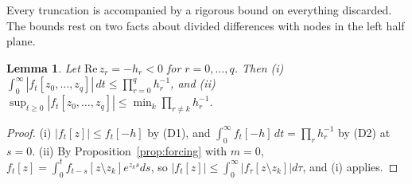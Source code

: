 \documentclass[aps,pra,superscriptaddress,floatfix,longbibliography,twocolumn]{revtex4-2}
\newtheorem{lemma}{Lemma}
\begin{document}
Every truncation is accompanied by a rigorous bound on everything discarded. The bounds rest on two facts about divided differences with nodes in the left half plane.

\begin{lemma}\label{lem:dd}
Let $\mathrm{Re}\,z_r=-h_r<0$ for $r=0,\dots,q$. Then
(i) $\int_0^\infty|f_t[z_0,\dots,z_q]|\,dt\le\prod_{r=0}^q h_r^{-1}$, and
(ii) $\sup_{t\ge0}|f_t[z_0,\dots,z_q]|\le\min_k\prod_{r\neq k}h_r^{-1}$.
\end{lemma}
\begin{proof}
(i) $|f_t[z]|\le f_t[-h]$ by (D1), and $\int_0^\infty f_t[-h]\,dt=\prod_r h_r^{-1}$ by (D2) at $s=0$. (ii) By Proposition~\ref{prop:forcing} with $m=0$, $f_t[z]=\int_0^tf_{t-s}[z\setminus z_k]e^{z_ks}ds$, so $|f_t[z]|\le\int_0^\infty|f_\tau[z\setminus z_k]|d\tau$, and (i) applies.
\end{proof}
\end{document}
